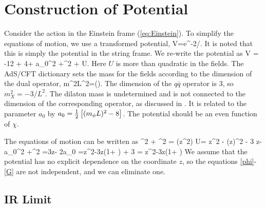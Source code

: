 \section{Construction of Potential}

Consider the action in the Einstein frame (\ref{eq:Einstein}).
To simplify the equations of motion, we use a transformed potential, 
\be
V=e^{-2\phi/}.
\label{transform}
\ee
It is noted that this is simply the potential in the string frame.
We re-write the potential as
\be
V = -12 + 4\phi + a_0\phi^2 +\chi^2 + U.
\label{V}
\ee
Here $U$ is more than quadratic in the fields. 
 The AdS/CFT dictionary sets the mass for the fields according to the dimension of the dual operator,
\be
m^2L^2=\Delta().
\ee
The dimension of the $q\bar{q}$ operator is 3, so $m_X^2 = -3/L^2$.
The dilaton mass is undetermined and is not connected to the dimension of the corresponding operator, as discussed in \cite{Springer2010}.  
It is related to the parameter $a_0$ by $a_0 = \thalf \left[ \mL2-8 \right]$. 
The potential should be an even function of $\chi$. 

The equations of motion can be written as
\be
\chidot^2 + \Gdot^2 =  \Dz(z^2\phidot)
\label{C}
\ee
\be
U=\thalf {} z^2 \phiddot - \tthalf (z\phidot)^2 - 3  z\phi - a_0\phi^2 +\tthalf\chi^2
\label{U}
\ee
\be
 =3z\phidot - 2a_0\phi
\label{phi}
\ee
\be
=z^2\chiddot -3z\chidot \left(1+ \right) + 3\chi
\label{chi}
\ee
\be
 =
z^2\Gddot -3z\Gdot \left(1+ \right)
\label{G}
\ee
We assume that the potential has no explicit dependence on the coordinate $z$,  so the equations \ref{phi}-\ref{G} are not independent, and we can eliminate one. 

\subsection{IR Limit}

